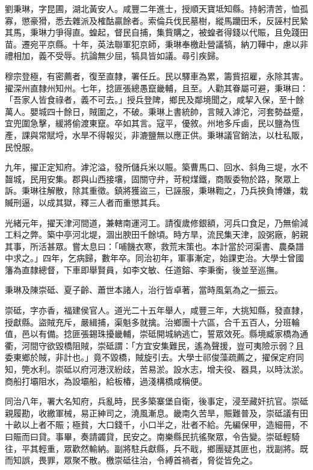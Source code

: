 \begin{pinyinscope}
劉秉琳，字昆圃，湖北黃安人。咸豐二年進士，授順天寶坻知縣。持躬清苦，恤孤寡，懲豪猾，悉去雜派及榷酤贏餘者。索倫兵伐民墓樹，縱馬躪田禾，反誣村民縶其馬，秉琳力爭得直。蝗起，督民自捕，集貲購之，被蝗者得錢以代賑，且免踐田苗。遷宛平京縣。十年，英法聯軍犯京師，秉琳奉檄赴營議犒，納刀鞾中，慮以非禮相加，義不受辱。抗論無少屈，犒具皆如議。尋引疾歸。

穆宗登極，有密薦者，復至直隸，署任丘。民以驛車為累，籌貲招雇，永除其害。擢深州直隸州知州。七年，捻匪張總愚竄畿輔，且至。人勸其眷屬可避，秉琳曰：「吾家人皆食祿者，義不可去。」授兵登陴，鄉民及鄰境聞之，咸挈入保，至十餘萬人。嬰城四十餘日，賊圍之，不破。秉琳上書統帥，言賊入滹沱，河套勢益蹙，宜兜圍急擊，緩將偷渡東竄。卒如其言。寇平，優敘。州地多斥鹵，民以鹽為恆產，課與常賦埒，水旱不得報災，非漉鹽無以應正供。秉琳議官銷法，以杜私販，民悅服。

九年，擢正定知府。滹沱溢，發所儲兵米以賑。築曹馬口、回水、斜角三堤，水不齧城，民用安集。郡與山西接壤，固關守弁，苛稅煤鐵，商販委物於路，聚眾上訴。秉琳往解散，除其重徵。鎮將獲盜三，已誣服，秉琳鞫之，乃兵挾負博嫌，栽贓刑逼，以成其獄，釋三人者而重懲其兵。

光緒元年，擢天津河間道，兼轄南運河工。請復歲修銀額，河兵口食足，乃無偷減工料之弊。築中亭河北堤，涸出腴田千餘頃。時方旱，流民集天津，設粥廠，躬親其事，所活甚眾。嘗太息曰：「哺饑衣寒，救荒末策也。本計當於河渠書、農桑譜中求之。」四年，乞病歸，數年卒。同治初年，軍事漸定，始課吏治。大學士曾國籓為直隸總督，下車即舉賢員，如李文敏、任道鎔、李秉衡，後並至巡撫。

秉琳及陳崇砥、夏子齡、蕭世本諸人，治行皆卓著，當時風氣為之一振云。

崇砥，字亦香，福建侯官人。道光二十五年舉人，咸豐三年，大挑知縣，發直隸，授獻縣。盜賊充斥，嚴緝捕，渠魁多就擒。治鄉團十六區，合千五百人，分班輪值，邑以有備。捻匪張錫珠擾畿輔，崇砥開城納逃亡，誓眾效死。縣境臧家橋為通衢，河間守欲毀橋阻賊，崇砥謂：「方宜安集難民，遙為聲援，豈可夷險示弱？且委東鄉於賊，非計也。」竟不毀橋，賊旋引去。大學士祁俊藻疏薦之，擢保定府同知，筦水利。崇砥以府河港汊紛歧，苦易淤。設水志，增夫役、器具，以時汰淤。商船打壩阻水，為設壩船，給板椿，過淺構橋咸稱便。

同治八年，署大名知府，兵亂時，民多築寨堡自衛，後事定，浸至藏奸抗官。崇砥親履勘，收繳軍械，易正紳司之，澆風漸息。畿南久苦旱，賑難普及，崇砥議有田十畝以上者不賑；極貧，大口錢千，小口半之，壯者不給。先編保甲，造細冊，不曰賑而曰貸。事畢，奏請蠲貸，民安之。南樂縣民抗徭聚眾，令告變。崇砥輕騎往，平其輕重，眾歡然輸納。副將駐兵獻縣，兵不戢，鄉團疑其匪也，戕副將。既而知誤，畏罪，眾聚不散。檄崇砥往治，令縛首禍者，脅從皆免之。


\end{pinyinscope}

